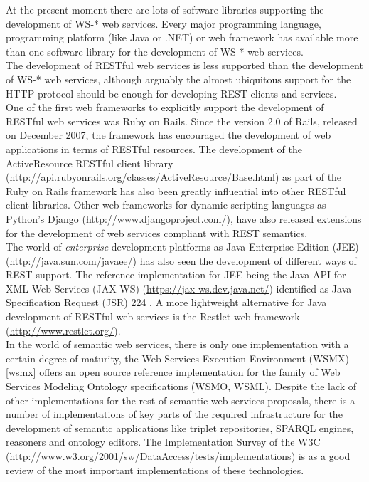 At the present moment there are lots of software libraries supporting the development of WS-* web services. Every major
programming language, programming platform (like Java or .NET) or web framework has available more than one software
library for the development of WS-* web services.\\
The development of RESTful web services is less supported than the development of WS-* web services, although arguably
the almost ubiquitous support for the HTTP protocol should be enough for developing REST clients and services.\\
 One of the first web frameworks to explicitly support the development of RESTful web services was Ruby on Rails. Since the
version 2.0 of Rails, released on December 2007, the framework has encouraged the development of web applications in
terms of RESTful resources. The development of the ActiveResource RESTful client library (\url{http://api.rubyonrails.org/classes/ActiveResource/Base.html}) as part of the Ruby on Rails
framework has also been greatly influential into other RESTful client libraries. Other web frameworks for dynamic
scripting languages as Python's Django (\url{http://www.djangoproject.com/}), have also released extensions for the development of web services compliant with
REST semantics. \\
The world of {\it enterprise} development platforms as Java Enterprise Edition (JEE) (\url{http://java.sun.com/javaee/}) has also seen the development of
different ways of REST support. The reference implementation for JEE being the Java API for XML Web Services (JAX-WS) (\url{https://jax-ws.dev.java.net/})
identified as Java Specification Request (JSR) 224 \cite{jaxws}. A more lightweight alternative for Java development of RESTful web
services is the Restlet web framework (\url{http://www.restlet.org/}).\\
In the world of semantic web services, there is only one implementation with a certain degree of maturity, the Web
Services Execution Environment (WSMX) \ref{wsmx} offers an open source reference implementation for the family of Web Services
Modeling Ontology specifications (WSMO, WSML). Despite the lack of other implementations for the rest of semantic web
services proposals, there is a number of implementations of key parts of the required infrastructure for the development
of semantic applications like triplet repositories, SPARQL engines, reasoners and ontology editors. The Implementation Survey of the W3C (\url{http://www.w3.org/2001/sw/DataAccess/tests/implementations}) is as a good review of the most important implementations of these
technologies.\\

